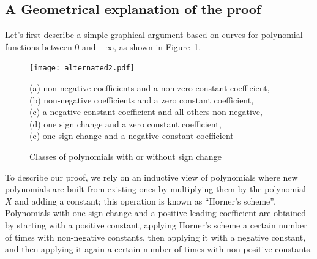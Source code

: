 \documentclass{mscs}
\begin{document}
\subsection{A Geometrical explanation of the proof}
Let's first describe a simple graphical argument based on curves for
polynomial functions between 0 and \(+\infty\), as shown in
Figure~\ref{graph-desc}.
\begin{figure}
\begin{center}
\texttt{[image: alternated2.pdf]}
\end{center}
{(a) non-negative coefficients and a non-zero constant coefficient,\\
(b) non-negative coefficients and a zero constant coefficient,\\
(c) a negative constant coefficient and all others non-negative,\\
(d) one sign change and a zero constant coefficient,\\
(e) one sign change and a negative constant coefficient}

\caption{\label{graph-desc}
Classes of polynomials with or without
sign change}
\end{figure}
To describe our proof, we rely on an inductive view of polynomials
where new polynomials are built from
existing ones by multiplying them by the polynomial \(X\) and adding a
constant; this operation is known as ``Horner's scheme''.
Polynomials with one sign change and a positive leading coefficient
are obtained by starting with a positive constant, applying Horner's
scheme a certain number of times with non-negative constants, then
applying it with a negative constant, and then applying it again a certain
number of times with non-positive constants.
\end{document}
